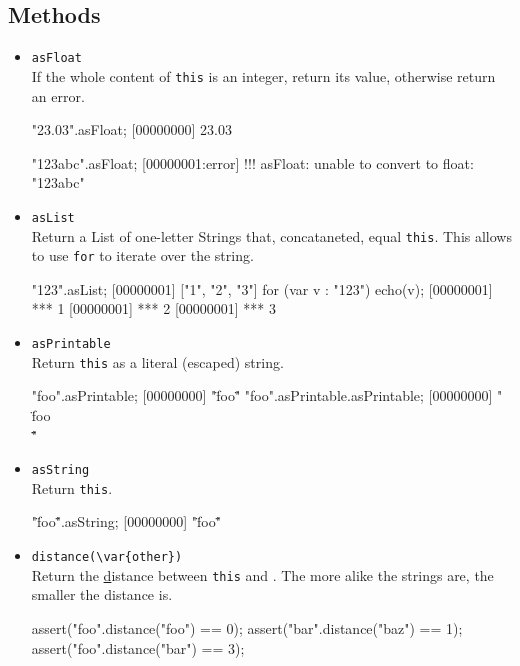\subsection{Methods}
\begin{itemize}
\item \lstinline|asFloat|\\
  If the whole content of \lstinline|this| is an integer, return its
  value, otherwise return an error.
\begin{urbiscript}
"23.03".asFloat;
[00000000] 23.03

"123abc".asFloat;
[00000001:error] !!! asFloat: unable to convert to float: "123abc"
\end{urbiscript}

\item \lstinline|asList|\\
  Return a List of one-letter Strings that, concataneted, equal
  \lstinline|this|.  This allows to use \lstinline|for| to iterate
  over the string.
\begin{urbiscript}
"123".asList;
[00000001] ["1", "2", "3"]
for (var v : "123")
  echo(v);
[00000001] *** 1
[00000001] *** 2
[00000001] *** 3
\end{urbiscript}

\item \lstinline|asPrintable|\\
  Return \lstinline|this| as a literal (escaped) string.
\begin{urbiscript}
"foo".asPrintable;
[00000000] "\"foo\""
"foo".asPrintable.asPrintable;
[00000000] "\"\\\"foo\\\"\""
\end{urbiscript}

\item \lstinline|asString|\\
  Return \lstinline|this|.
\begin{urbiscript}
"\"foo\"".asString;
[00000000] "\"foo\""
\end{urbiscript}

\item \lstinline|distance(\var{other})|\\
  Return the
  \href{http://en.wikipedia.org/wiki/Damerau-Levenshtein_distance,
    Damerau-Levenshtein} distance between \lstinline|this| and
  .  The more alike the strings are, the smaller the
  distance is.
\begin{urbiscript}
assert("foo".distance("foo") == 0);
assert("bar".distance("baz") == 1);
assert("foo".distance("bar") == 3);
\end{urbiscript}


\end{itemize}
